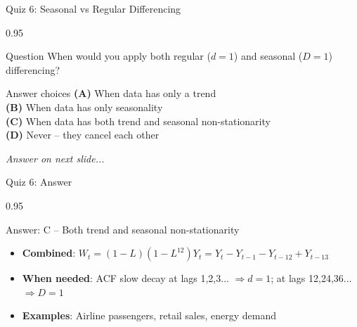 \documentclass[9pt, aspectratio=169, t]{beamer}
\begin{document}
\begin{frame}{Quiz 6: Seasonal vs Regular Differencing}
    \begin{cminipage}{0.95\textwidth}
    \begin{alertblock}{Question}
        When would you apply both regular ($d=1$) and seasonal ($D=1$) differencing?
    \end{alertblock}

    \vspace{0.4cm}

    \begin{block}{Answer choices}
        \textcolor{MainBlue}{\textbf{(A)}} When data has only a trend\\[3pt]
        \textcolor{MainBlue}{\textbf{(B)}} When data has only seasonality\\[3pt]
        \textcolor{MainBlue}{\textbf{(C)}} When data has both trend and seasonal non-stationarity\\[3pt]
        \textcolor{MainBlue}{\textbf{(D)}} Never -- they cancel each other
    \end{block}

    \vspace{0.5cm}

    \begin{center}
        \textit{Answer on next slide...}
    \end{center}
    \end{cminipage}
\end{frame}

\begin{frame}{Quiz 6: Answer}
    \begin{cminipage}{0.95\textwidth}
    \begin{exampleblock}{Answer: C -- Both trend and seasonal non-stationarity}
        \begin{itemize}
            \item \textbf{Combined}: $W_t = (1-L)(1-L^{12})Y_t = Y_t - Y_{t-1} - Y_{t-12} + Y_{t-13}$
            \item \textbf{When needed}: ACF slow decay at lags 1,2,3... $\Rightarrow d=1$; at lags 12,24,36... $\Rightarrow D=1$
            \item \textbf{Examples}: Airline passengers, retail sales, energy demand
        \end{itemize}
    \end{exampleblock}

    \end{cminipage}
\end{frame}
\end{document}

